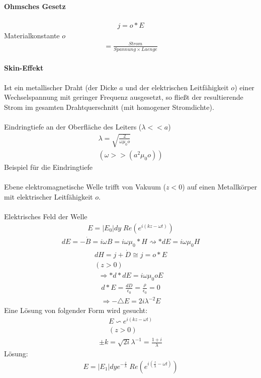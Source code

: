 \documentclass[10pt,a4paper]{article}
\begin{document}
\paragraph{Ohmsches Gesetz}
\begin{align}
j= o * E
\end{align}
Materialkonstante $ o$
\begin{align}
[o]= \frac{Strom}{Spannung \times Laenge}
\end{align}
\paragraph{Skin-Effekt}
Ist ein metallischer Draht (der Dicke $a$ und der elektrischen Leitfähigkeit $o$) einer Wechselspannung mit geringer Frequenz ausgesetzt, so fließt der resultierende Strom im gesamten Drahtquerschnitt (mit homogener Stromdichte).\\
\\
Eindringtiefe an der Oberfläche des Leiters ($\lambda << a $)
\begin{align}
\lambda = \sqrt{\frac{2}{\omega  \mu_0 o}} \\
(\omega >> ( a^2 \mu_0 o))
\end{align} 
Beispiel für die Eindringtiefe\\
\\
Ebene elektromagnetische Welle trifft von Vakuum  ($z<0$) auf einen Metallkörper mit elektrischer Leitfähigkeit $o$. \\
\\
Elektrisches Feld der Welle
\begin{align}
E= \vert E_0 \vert dy \; Re( e^{i(kz-\omega t)})
\end{align}
\begin{align}
dE=-\dot{B}= i \omega B = i \omega \mu_0 * H \rightsquigarrow *dE= i \omega \mu_0 H
\end{align}
\begin{align}
dH= j+ \dot{D} \cong j = o * E \\
(z>0)
\end{align}
\begin{align}
\Rightarrow *d*dE= i \omega \mu_0 o E
\end{align}
\begin{align}
d*E=\frac{dD}{\epsilon_0}= \frac{\rho}{\epsilon_0}=0
\end{align}
\begin{align}
\Rightarrow - \triangle E = 2 i \lambda^{-2} E
\end{align}
Eine Lösung von folgender Form wird gesucht:
\begin{align}
E \backsim e^{i(kz-\omega t)} \\
(z>0)
\end{align}
\begin{align}
\pm k = \sqrt{2i} \lambda^{-1} = \frac{1+i}{\lambda}
\end{align}
Lösung:
\begin{align}
E= \vert E_1 \vert dy e^{-\frac{z}{\lambda}}  \; Re( e^{i(\frac{z}{\lambda}- \omega t)})
\end{align}
\end{document}
